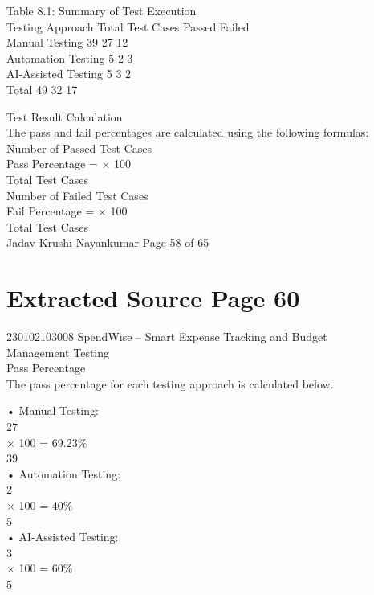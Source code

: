 \documentclass[12pt,a4paper]{report}
\begin{document}
\smallskip
Table 8.1: Summary of Test Execution\\ 

\smallskip
Testing Approach Total Test Cases Passed Failed\\ 
Manual Testing                  39             27        12\\ 
Automation Testing              5               2        3\\ 
AI-Assisted Testing             5               3        2\\ 
Total                           49             32       17\\ 

\smallskip

\smallskip

 Test Result Calculation\\ 

\smallskip
The pass and fail percentages are calculated using the following formulas:\\ 

\smallskip
Number of Passed Test Cases\\ 
Pass Percentage =                                × 100\\ 
Total Test Cases\\ 

\smallskip
Number of Failed Test Cases\\ 
Fail Percentage =                               × 100\\ 
Total Test Cases\\ 
Jadav Krushi Nayankumar                                                          Page 58 of 65\\ 

\clearpage
\section*{Extracted Source Page 60}
230102103008                          SpendWise – Smart Expense Tracking and Budget\\ 
Management Testing\\ 

 Pass Percentage\\ 

\smallskip
The pass percentage for each testing approach is calculated below.\\ 

\smallskip

\smallskip
• Manual Testing:\\ 
27\\ 
× 100 = 69.23\%\\ 
39\\ 
• Automation Testing:\\ 
2\\ 
× 100 = 40\%\\ 
5\\ 
• AI-Assisted Testing:\\ 
3\\ 
× 100 = 60\%\\ 
5\\ 
\end{document}
